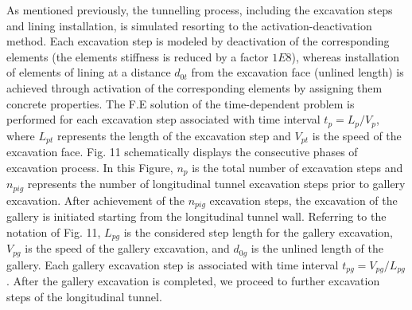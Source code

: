 \documentclass[a4paper,fleqn]{cas-sc}
\begin{document}
As mentioned previously, the tunnelling process, including the excavation steps and lining installation, is simulated resorting to the activation-deactivation method. Each excavation step is modeled by deactivation of the corresponding elements (the elements stiffness is reduced by a factor $1E8$), whereas installation of elements of lining at a distance $d_{0t}$ from the excavation face (unlined length) is achieved through activation of the corresponding elements by assigning them concrete properties. The F.E solution of the time-dependent problem is performed for each excavation step associated with time interval $t_p = L_p/V_p$, where $L_{pt}$ represents the length of the excavation step and $V_{pt}$ is the speed of the excavation face. Fig. 11 schematically displays the consecutive phases of excavation process. In this Figure, $n_p$ is the total number of excavation steps and $n_{pig}$ represents the number of longitudinal tunnel excavation steps prior to gallery excavation. After achievement of the $n_{pig}$ excavation steps, the excavation of the gallery is initiated starting from the longitudinal tunnel wall. Referring to the notation of Fig. 11,  $L_{pg}$ is the considered step length for the gallery excavation, $V_{pg}$ is the speed of the gallery excavation, and $d_{0g}$ is the unlined length of the gallery. Each gallery excavation step is associated with time interval $t_{pg} = V_{pg}/L_{pg}$. After the gallery excavation is completed, we proceed to further excavation steps of the longitudinal tunnel. 
\end{document}
